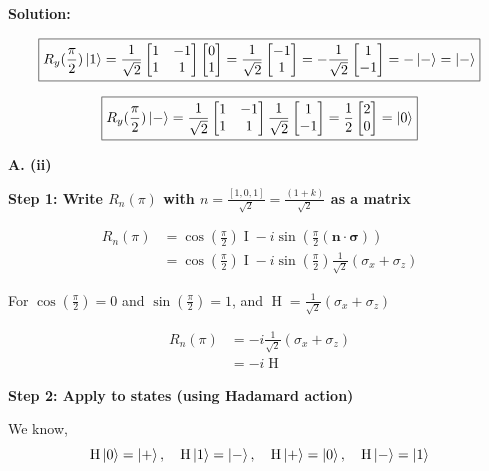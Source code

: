 \documentclass[11pt]{article}
\newenvironment{solution}
{\par\noindent\textbf{Solution:}\par}
{\vspace{1em}}
\begin{document}
\begin{solution}
\[\boxed{R_y(\frac{\pi}{2})\ket{1} = \frac{1}{\sqrt{2}}\begin{bmatrix}1 & -1 \\ 1 & 1\end{bmatrix}\begin{bmatrix}0 \\ 1\end{bmatrix} = \frac{1}{\sqrt{2}}\begin{bmatrix}-1 \\ 1\end{bmatrix} = -\frac{1}{\sqrt{2}}\begin{bmatrix}1 \\ -1\end{bmatrix} = -\ket{-} = \ket{-}}\]

\[\boxed{R_y(\frac{\pi}{2})\ket{-} = \frac{1}{\sqrt{2}}\begin{bmatrix}1 & -1 \\ 1 & 1\end{bmatrix}\frac{1}{\sqrt{2}}\begin{bmatrix}1 \\ -1\end{bmatrix} = \frac{1}{2}\begin{bmatrix}2 \\ 0\end{bmatrix} = \ket{0}}\]

\textbf{A. (ii)}

\textbf{Step 1: Write $R_n(\pi)$ with $n = \frac{[1,0,1]}{\sqrt{2}} = \frac{(1+k)}{\sqrt{2}}$ as a matrix}

\[\begin{aligned}
R_n(\pi) &= \cos(\frac{\pi}{2})\operatorname{I} - i\sin(\frac{\pi}{2}(\boldsymbol{n} \cdot \boldsymbol{\sigma})) \\
&= \cos(\frac{\pi}{2})\operatorname{I} - i\sin(\frac{\pi}{2})\frac{1}{\sqrt{2}}(\sigma_x + \sigma_z)
\end{aligned}\]

For $\cos(\frac{\pi}{2}) = 0$ and $\sin(\frac{\pi}{2}) = 1$, and $\operatorname{H} = \frac{1}{\sqrt{2}}(\sigma_x + \sigma_z)$

\[\begin{aligned}
R_n(\pi) &= - i\frac{1}{\sqrt{2}}(\sigma_x + \sigma_z) \\
&= -i\operatorname{H}
\end{aligned}\]

\textbf{Step 2: Apply to states (using Hadamard action)}

We know, \[\operatorname{H}\ket{0} = \ket{+}, \quad \operatorname{H}\ket{1} = \ket{-}, \quad \operatorname{H}\ket{+} = \ket{0}, \quad \operatorname{H}\ket{-} = \ket{1}\]


\end{solution}
\end{document}
